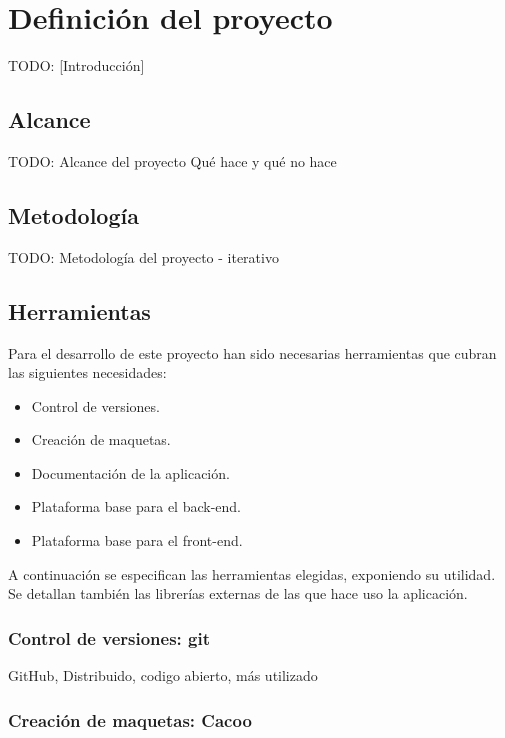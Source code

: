 \chapter{Definición del proyecto\label{cap:defProyecto}}

TODO: [Introducción]

\section{Alcance\label{sec:dp:alcance}}

TODO: Alcance del proyecto
Qué hace y qué no hace


\section{Metodología\label{sec:dp:metodologia}}

TODO: Metodología del proyecto - iterativo

\section{Herramientas\label{sec:dp:herramientas}}

Para el desarrollo de este proyecto han sido necesarias herramientas que cubran las siguientes necesidades:

\begin{itemize}
  \item Control de versiones.
  \item Creación de maquetas.
  \item Documentación de la aplicación.
  \item Plataforma base para el \gls{back-end}.
  \item Plataforma base para el \gls{front-end}.
\end{itemize}

A continuación se especifican las herramientas elegidas, exponiendo su utilidad.
Se detallan también las librerías externas de las que hace uso la aplicación.

\subsection*{Control de versiones: git\label{ssec:dp:git}}

GitHub, Distribuido, codigo abierto, más utilizado

\cite{git}
\cite{github}

\subsection*{Creación de maquetas: Cacoo\label{ssec:dp:cacoo}}

